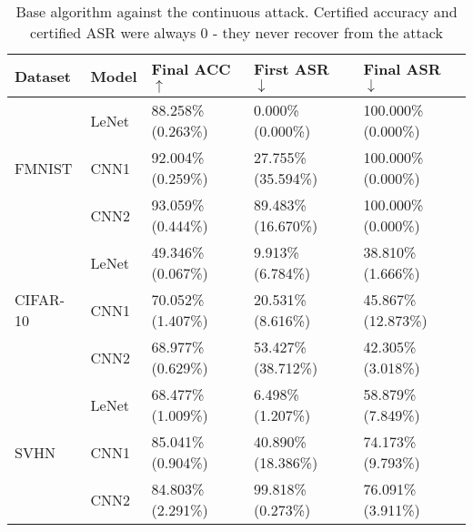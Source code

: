\documentclass[conference,compsoc]{IEEEtran}
\begin{document}
\begin{table}[H]
\centering
\caption{Base algorithm against the continuous attack. Certified accuracy and certified ASR were always 0 - they never recover from the attack}
\begin{tabular}{lllll}
\hline
\textbf{Dataset} & \textbf{Model} & \textbf{Final ACC} $\uparrow$ & \textbf{First ASR} $\downarrow$ & \textbf{Final ASR} $\downarrow$ \\
\hline
\multirow{3}{*}{FMNIST} & LeNet & 88.258\% (0.263\%) & 0.000\% (0.000\%) & 100.000\% (0.000\%) \\
& CNN1 & 92.004\% (0.259\%) & 27.755\% (35.594\%) & 100.000\% (0.000\%) \\
& CNN2 & 93.059\% (0.444\%) & 89.483\% (16.670\%) & 100.000\% (0.000\%) \\
\hline
\multirow{3}{*}{CIFAR-10} & LeNet & 49.346\% (0.067\%) & 9.913\% (6.784\%) & 38.810\% (1.666\%) \\
& CNN1 & 70.052\% (1.407\%) & 20.531\% (8.616\%) & 45.867\% (12.873\%) \\
& CNN2 & 68.977\% (0.629\%) & 53.427\% (38.712\%) & 42.305\% (3.018\%) \\
\hline
\multirow{3}{*}{SVHN} & LeNet & 68.477\% (1.009\%) & 6.498\% (1.207\%) & 58.879\% (7.849\%) \\
& CNN1 & 85.041\% (0.904\%) & 40.890\% (18.386\%) & 74.173\% (9.793\%) \\
& CNN2 & 84.803\% (2.291\%) & 99.818\% (0.273\%) & 76.091\% (3.911\%) \\
\hline
\end{tabular}
\end{table}

\newpage
\end{document}
